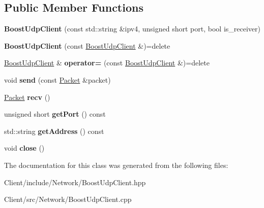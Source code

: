 \subsection*{Public Member Functions}
\begin{DoxyCompactItemize}
\item 
\mbox{\label{classbbl_1_1cli_1_1_boost_udp_client_af207eb99cc70e7c41baacdbab0e07e80}} 
{\bfseries Boost\+Udp\+Client} (const std\+::string \&ipv4, unsigned short port, bool is\+\_\+receiver)
\item 
\mbox{\label{classbbl_1_1cli_1_1_boost_udp_client_aa2d49a11b5a4d645c137544c2264eb09}} 
{\bfseries Boost\+Udp\+Client} (const \hyperlink{classbbl_1_1cli_1_1_boost_udp_client}{Boost\+Udp\+Client} \&)=delete
\item 
\mbox{\label{classbbl_1_1cli_1_1_boost_udp_client_a91b9cf1dfadec551e69a8a74407a0383}} 
\hyperlink{classbbl_1_1cli_1_1_boost_udp_client}{Boost\+Udp\+Client} \& {\bfseries operator=} (const \hyperlink{classbbl_1_1cli_1_1_boost_udp_client}{Boost\+Udp\+Client} \&)=delete
\item 
\mbox{\label{classbbl_1_1cli_1_1_boost_udp_client_a4dc85825ff44f877ebf686f52639ce2d}} 
void {\bfseries send} (const \hyperlink{classbbl_1_1cli_1_1_packet}{Packet} \&packet)
\item 
\mbox{\label{classbbl_1_1cli_1_1_boost_udp_client_acb133442fe8501c05ceb918153c3fe75}} 
\hyperlink{classbbl_1_1cli_1_1_packet}{Packet} {\bfseries recv} ()
\item 
\mbox{\label{classbbl_1_1cli_1_1_boost_udp_client_a50bf4567a00e5eaeddb4ab0b2f03b7ce}} 
unsigned short {\bfseries get\+Port} () const
\item 
\mbox{\label{classbbl_1_1cli_1_1_boost_udp_client_a085689d1413a8f8c78a245475b56f931}} 
std\+::string {\bfseries get\+Address} () const
\item 
\mbox{\label{classbbl_1_1cli_1_1_boost_udp_client_aa484ce9f37376d6efca4585cbe42fe6d}} 
void {\bfseries close} ()
\end{DoxyCompactItemize}


The documentation for this class was generated from the following files\+:\begin{DoxyCompactItemize}
\item 
Client/include/\+Network/Boost\+Udp\+Client.\+hpp\item 
Client/src/\+Network/Boost\+Udp\+Client.\+cpp\end{DoxyCompactItemize}
